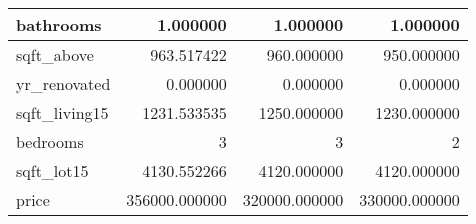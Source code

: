 \begin{table}[H]
\begin{tabular}{|l|r|r|r|}
\hline bathrooms & \cellcolor[rgb]{0.9, 0.54, 0.52} 1.000000 & \cellcolor[rgb]{0.9, 0.54, 0.52} 1.000000 & \cellcolor[rgb]{0.9, 0.54, 0.52} 1.000000 \\
\hline sqft\_above & \cellcolor[rgb]{0.9, 0.54, 0.52} 963.517422 & 960.000000 & 950.000000 \\
\hline yr\_renovated & \cellcolor[rgb]{0.9, 0.54, 0.52} 0.000000 & \cellcolor[rgb]{0.9, 0.54, 0.52} 0.000000 & \cellcolor[rgb]{0.9, 0.54, 0.52} 0.000000 \\
\hline sqft\_living15 & \cellcolor[rgb]{0.9, 0.54, 0.52} 1231.533535 & 1250.000000 & 1230.000000 \\
\hline bedrooms & \cellcolor[rgb]{0.9, 0.54, 0.52} 3 & \cellcolor[rgb]{0.9, 0.54, 0.52} 3 & 2 \\
\hline sqft\_lot15 & \cellcolor[rgb]{0.9, 0.54, 0.52} 4130.552266 & 4120.000000 & 4120.000000 \\
\hline price & \cellcolor[rgb]{0.9, 0.54, 0.52} 356000.000000 & 320000.000000 & 330000.000000 \\
\hline
\end{tabular}
\end{table}

